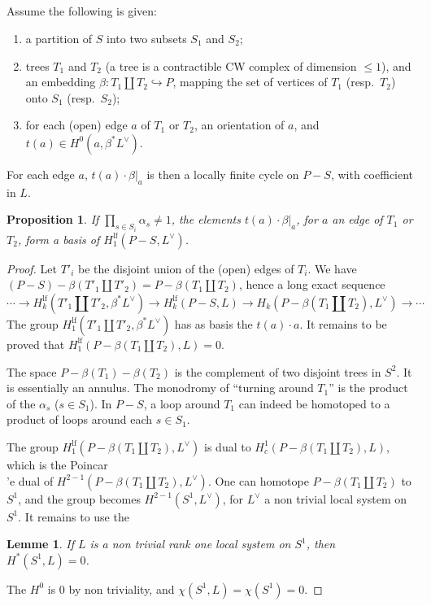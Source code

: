\documentclass[12pt,a4paper]{article}
\theoremstyle{plain}
\newtheorem{lemma}[theorem]{Lemme}
\newtheorem{proposition}[theorem]{Proposition}
\theoremstyle{definition}
\theoremstyle{remark}
\numberwithin{equation}{section}
\begin{document}
\subsection{}
Assume the following is given:
\begin{enumerate}[label=\alph*)]
\item a partition of $S$ into two subsets $S_1$ and $S_2$;
\item trees $T_1$ and $T_2$ (a tree is a contractible CW complex of dimension $\leq 1$), and an embedding $\beta: T_1 \amalg T_2 \hookrightarrow P$, mapping the set of vertices of $T_1$ (resp.\ $T_2$) onto $S_1$ (resp.\ $S_2$);
\item for each (open) edge $a$ of $T_1$ or $T_2$, an orientation of $a$, and $t(a) \in H^0(a, \beta^*L^\vee)$.
\end{enumerate}
For each edge $a$, $t(a) \cdot \beta|_a$ is then a locally finite cycle on $P-S$, with coefficient in $L$.

\begin{proposition}\label{prop:2.5.1}
If $\prod_{s \in S_i} \alpha_s \neq 1$, the elements $t(a) \cdot \beta|_a$, for $a$ an edge of $T_1$ or $T_2$, form a basis of $H^{\mathrm{lf}}_1(P-S, L^\vee)$.
\end{proposition}

\begin{proof}
Let $T'_i$ be the disjoint union of the (open) edges of $T_i$. We have $(P-S) - \beta(T'_1 \amalg T'_2) = P - \beta(T_1 \amalg T_2)$, hence a long exact sequence
\[
\cdots \to H^{\mathrm{lf}}_k(T'_1 \amalg T'_2, \beta^*L^\vee) \to H^{\mathrm{lf}}_k(P-S, L) \to H_k(P - \beta(T_1 \amalg T_2), L^\vee) \to \cdots
\]
The group $H^{\mathrm{lf}}_1(T'_1 \amalg T'_2, \beta^*L^\vee)$ has as basis the $t(a) \cdot a$. It remains to be proved that $H^{\mathrm{lf}}_1(P - \beta(T_1 \amalg T_2), L) = 0$.

The space $P - \beta(T_1) - \beta(T_2)$ is the complement of two disjoint trees in $S^2$. It is essentially an annulus. The monodromy of ``turning around $T_1$'' is the product of the $\alpha_s$ ($s \in S_1$). In $P-S$, a loop around $T_1$ can indeed be homotoped to a product of loops around each $s \in S_1$.

The group $H^{\mathrm{lf}}_1(P - \beta(T_1 \amalg T_2), L^\vee)$ is dual to $H^1_c(P - \beta(T_1 \amalg T_2), L)$, which is the Poincar\\'e dual of $H^{2-1}(P - \beta(T_1 \amalg T_2), L^\vee)$. One can homotope $P - \beta(T_1 \amalg T_2)$ to $S^1$, and the group becomes $H^{2-1}(S^1, L^\vee)$, for $L^\vee$ a non trivial local system on $S^1$. It remains to use the
\begin{lemma}
If $L$ is a non trivial rank one local system on $S^1$, then $H^*(S^1, L) = 0$.
\end{lemma}
The $H^0$ is $0$ by non triviality, and $\chi(S^1, L) = \chi(S^1) = 0$.
\end{proof}
\end{document}

